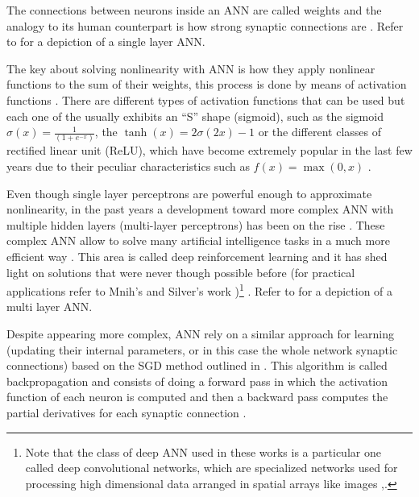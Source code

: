 \documentclass{seal_thesis}
\begin{document}
The connections between neurons inside an ANN are called weights and the analogy to its human counterpart is how strong synaptic connections are \cite[p. 216]{Sutton2017}. Refer to  for a depiction of a single layer ANN.

The key about solving nonlinearity with ANN is how they apply nonlinear functions to the sum of their weights, this process is done by means of activation functions \cite[p. 216]{Sutton2017}. There are different types of activation functions that can be used but each one of the usually exhibits an ``S'' shape (\ie sigmoid), such as the sigmoid $\sigma(x) = \frac{1}{(1+e^{-x})}$, the $\tanh(x) = 2\sigma(2x)-1$ or the different classes of rectified linear unit (ReLU), which have become extremely popular in the last few years due to their peculiar characteristics such as $f(x) = \max(0,x)$ \cite[p. 216]{Sutton2017}.


Even though single layer perceptrons are powerful enough to approximate nonlinearity, in the past years a development toward more complex ANN with multiple hidden layers (\ie multi-layer perceptrons) has been on the rise \cite[p. 217]{Sutton2017}. These complex ANN allow to solve many artificial intelligence tasks in a much more efficient way \cite{Bengio2009}. This area is called deep reinforcement learning and it has shed light on solutions that were never though possible before (for practical applications refer to Mnih's \cite{Mnih2015} and Silver's work \cite{Silver2016})\footnote{Note that the class of deep ANN used in these works is a particular one called deep convolutional networks, which are specialized networks used for processing high dimensional data arranged in spatial arrays like images \cite[p. 219]{Sutton2017},\cite{Lecun1998}.} \cite{Bengio2009}. Refer to  for a depiction of a multi layer ANN.


Despite appearing more complex, ANN rely on a similar approach for learning (\ie updating their internal parameters, or in this case the whole network synaptic connections) based on the SGD method outlined in  \cite[p. 217]{Sutton2017}. This algorithm is called backpropagation and consists of doing a forward pass in which the activation function of each neuron is computed and then a backward pass computes the partial derivatives for each synaptic connection \cite[p. 218]{Sutton2017}.
\end{document}
